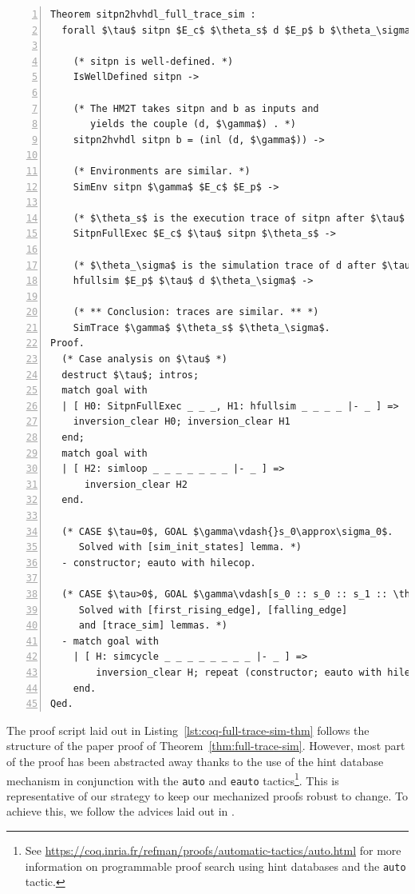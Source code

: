 \begin{lstlisting}[language=Coq,caption={\coq{} implementation of
Theorem~\ref{thm:full-trace-sim} and the mechanized version of its
proof.},label={lst:coq-full-trace-sim-thm},
framexleftmargin=1.5em,
xleftmargin=2em,
numbers=left,
numberstyle=\tiny\ttfamily,
basicstyle=\fontsize{9}{11}\selectfont,
frame=tb]
Theorem sitpn2hvhdl_full_trace_sim :
  forall $\tau$ sitpn $E_c$ $\theta_s$ d $E_p$ b $\theta_\sigma$ $\gamma$,

    (* sitpn is well-defined. *)
    IsWellDefined sitpn ->
    
    (* The HM2T takes sitpn and b as inputs and 
       yields the couple (d, $\gamma$) . *)
    sitpn2hvhdl sitpn b = (inl (d, $\gamma$)) ->

    (* Environments are similar. *)
    SimEnv sitpn $\gamma$ $E_c$ $E_p$ ->
    
    (* $\theta_s$ is the execution trace of sitpn after $\tau$ clock cycles. *)
    SitpnFullExec $E_c$ $\tau$ sitpn $\theta_s$ ->    
    
    (* $\theta_\sigma$ is the simulation trace of d after $\tau$ clock cycles. *)
    hfullsim $E_p$ $\tau$ d $\theta_\sigma$ ->
    
    (* ** Conclusion: traces are similar. ** *)
    SimTrace $\gamma$ $\theta_s$ $\theta_\sigma$.
Proof.
  (* Case analysis on $\tau$ *)
  destruct $\tau$; intros;
  match goal with
  | [ H0: SitpnFullExec _ _ _, H1: hfullsim _ _ _ _ |- _ ] =>
    inversion_clear H0; inversion_clear H1
  end;
  match goal with
  | [ H2: simloop _ _ _ _ _ _ _ |- _ ] =>
      inversion_clear H2
  end.

  (* CASE $\tau=0$, GOAL $\gamma\vdash{}s_0\approx\sigma_0$. 
     Solved with [sim_init_states] lemma. *)
  - constructor; eauto with hilecop.

  (* CASE $\tau>0$, GOAL $\gamma\vdash[s_0 :: s_0 :: s_1 :: \theta_s]\sim[\sigma_0 :: \sigma'_0 :: \sigma_1 :: \theta_\sigma]$.   
     Solved with [first_rising_edge], [falling_edge] 
     and [trace_sim] lemmas. *)
  - match goal with
    | [ H: simcycle _ _ _ _ _ _ _ _ |- _ ] =>
        inversion_clear H; repeat (constructor; eauto with hilecop)
    end.
Qed.
\end{lstlisting}

The proof script laid out in Listing~\ref{lst:coq-full-trace-sim-thm}
follows the structure of the paper proof of
Theorem~\ref{thm:full-trace-sim}. However, most part of the proof has
been abstracted away thanks to the use of the hint database mechanism
in conjunction with the \texttt{auto} and \texttt{eauto}
tactics\footnote{See
  \url{https://coq.inria.fr/refman/proofs/automatic-tactics/auto.html}
  for more information on programmable proof search using hint
  databases and the \texttt{auto} tactic.}.  This is representative of
our strategy to keep our mechanized proofs robust to change. To
achieve this, we follow the advices laid out in \cite{Chlipala2010}.

